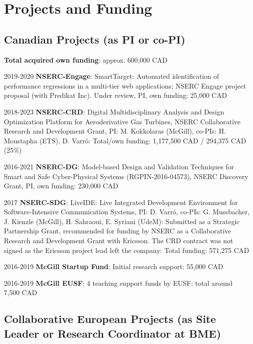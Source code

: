 \newpage 

\section{Projects and Funding} 


\subsection{Canadian Projects (as PI or co-PI)}
\textbf{Total acquired own funding}: approx. 600,000 CAD 

\begin{yearlist}
\item[2019-2020] \textbf{NSERC-Engage}: SmartTarget: Automated identification of performance regressions in a multi-tier web applications; NSERC Engage project proposal (with Predikat Inc). Under review, PI, own funding: 25,000 CAD 
\item[2018-2023] \textbf{NSERC-CRD}: Digital Multidisciplinary Analysis and Design Optimization Platform for Aeroderivative Gas Turbines, NSERC Collaborative Research and Development Grant, PI: M. Kokkolaras (McGill), co-PIs: H. Moustapha (ETS), 
D. Varr\'o:  Total/own funding: 1,177,500 CAD / 294,375 CAD (25\%)
\item[2016-2021] \textbf{NSERC-DG}: Model-based Design and Validation Techniques for
Smart and Safe Cyber-Physical Systems (RGPIN-2016-04573), NSERC Discovery Grant, PI, own funding: 230,000 CAD 
\item[2017] \textbf{NSERC-SDG}: LiveIDE: Live Integrated Development Environment for Software-Intensive Communication Systems, PI: D. Varr\'o, co-PIs: G. Mussbacher, J. Kienzle (McGill), H. Sahraoui, E. Syriani (UdeM): Submitted as a Strategic Partnership Grant, recommended for funding by NSERC as a Collaborative Research and Development Grant with Ericsson. The CRD contract was not signed as the Ericsson project lead left the company: Total funding: 571,275 CAD
\item[2016-2019] \textbf{McGill Startup Fund}: Initial research support: 55,000 CAD 
\item[2016-2019] \textbf{McGill EUSF}: 4 teaching support funds by EUSF: total around 7,500 CAD 
\end{yearlist}


\subsection{Collaborative European Projects (as Site Leader or Research Coordinator at BME)}

